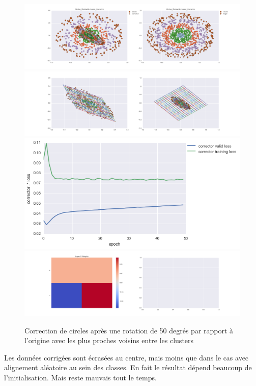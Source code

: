 \begin{figure}[H] %
\centering
\includegraphics[width=\linewidth]{fig/24-05-2016/circles/Circles_RotatedK-closest_Corrector-DATA.png}
\includegraphics[width=\linewidth]{fig/24-05-2016/circles/Circles_RotatedK-closest_Corrector-GridCheck.png}
\includegraphics[width=0.45\linewidth]{fig/24-05-2016/circles/Circles_RotatedK-closest_Corrector-Learning_curve.png}
\includegraphics[width=\linewidth]{fig/24-05-2016/circles/Circles_RotatedK-closest_Corrector-W.png}
\caption{Correction de circles après une rotation de 50 degrés par rapport à l'origine avec les plus proches voisins entre les clusters}
\label{fig:recap-circles-rot-exhaustive}
\end{figure}

Les données corrigées sont écrasées au centre, mais moins que dans le cas avec alignement
aléatoire au sein des classes. En fait le résultat dépend beaucoup de l'initialisation.
Mais reste mauvais tout le temps.


